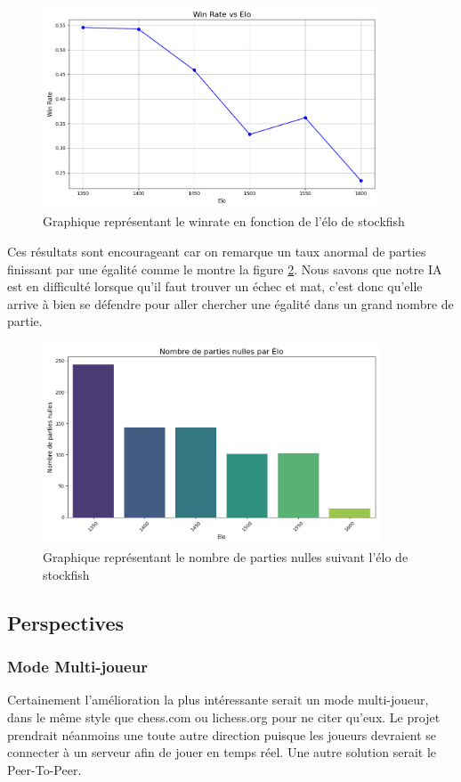 \documentclass{article}
\begin{document}
\begin{figure}[h]
    \centering
    \includegraphics[width=\textwidth,height=6.0cm,keepaspectratio]{winRateCmp.png}
    \caption{Graphique représentant le winrate en fonction de l'élo de stockfish}
    \label{winRateCmp}
\end{figure}

Ces résultats sont encourageant car on remarque un taux anormal de parties finissant par une égalité comme le montre la figure \ref{drawCountCmp}. Nous savons que notre IA
est en difficulté lorsque qu'il faut trouver un échec et mat, c'est donc qu'elle arrive à bien se défendre pour aller chercher une égalité
dans un grand nombre de partie.

\begin{figure}[h]
    \centering
    \includegraphics[width=\textwidth,height=6.0cm,keepaspectratio]{drawRate.png}
    \caption{Graphique représentant le nombre de parties nulles suivant l'élo de stockfish}
    \label{drawCountCmp}
\end{figure}

\subsection{Perspectives}
\subsubsection{Mode Multi-joueur}
Certainement l'amélioration la plus intéressante serait un mode multi-joueur, dans le même style que chess.com ou lichess.org pour ne citer qu'eux.
Le projet prendrait néanmoins une toute autre direction puisque les joueurs devraient se connecter à un serveur afin de jouer en temps réel. Une
autre solution serait le Peer-To-Peer.
\end{document}
